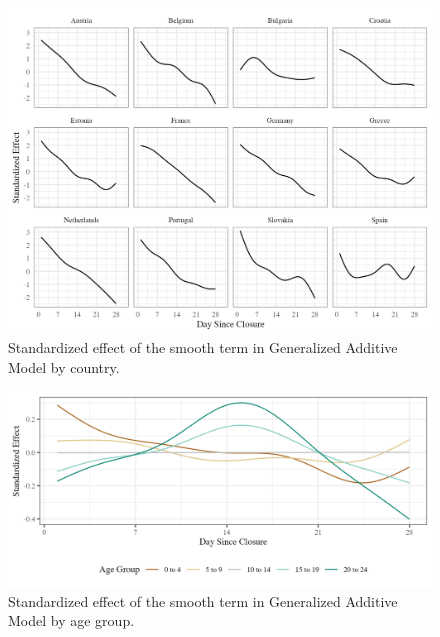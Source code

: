 \documentclass[unnumsec,webpdf,contemporary,large]{oup-authoring-template}%
\theoremstyle{thmstyleone}%
\theoremstyle{thmstyletwo}%
\theoremstyle{thmstylethree}%
\begin{document}
\begin{figure}
\includegraphics[width=\textwidth]{manuscript_files/figure-latex/country-1} \caption{Standardized effect of the smooth term in Generalized Additive Model by country.}\label{fig:country}
\end{figure}

\begin{figure}
\includegraphics[width=\textwidth]{manuscript_files/figure-latex/age-1} \caption{Standardized effect of the smooth term in Generalized Additive Model by age group.}\label{fig:age}
\end{figure}
\end{document}
